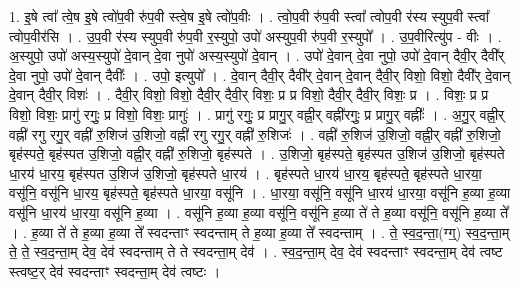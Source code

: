\documentclass[17pt]{extarticle}
\begin{document}
1. इ॒षे त्वा᳚ त्वे॒ष इ॒षे त्वो॑प॒वी रु॑प॒वी स्त्वे॒ष इ॒षे त्वो॑प॒वीः । . त्वो॒प॒वी रु॑प॒वी स्त्वा᳚ त्वोप॒वी र॑स्य स्युप॒वी स्त्वा᳚ त्वोप॒वीर॑सि । . उ॒प॒वी र॑स्य स्युप॒वी रु॑प॒वी र॒स्युपो॒ उपो॑ अस्युप॒वी रु॑प॒वी र॒स्युपो᳚ । . उ॒प॒वीरित्यु॑प - वीः । . अ॒स्युपो॒ उपो॑ अस्य॒स्युपो॑ दे॒वान् दे॒वा नुपो॑ अस्य॒स्युपो॑ दे॒वान् । . उपो॑ दे॒वान् दे॒वा नुपो॒ उपो॑ दे॒वान् दैवी॒र् दैवी᳚र् दे॒वा नुपो॒ उपो॑ दे॒वान् दैवीः᳚ । . उपो॒ इत्युपो᳚ । . दे॒वान् दैवी॒र् दैवी᳚र् दे॒वान् दे॒वान् दैवी॒र् विशो॒ विशो॒ दैवी᳚र् दे॒वान् दे॒वान् दैवी॒र् विशः॑ । . दैवी॒र् विशो॒ विशो॒ दैवी॒र् दैवी॒र् विशः॒ प्र प्र विशो॒ दैवी॒र् दैवी॒र् विशः॒ प्र । . विशः॒ प्र प्र विशो॒ विशः॒ प्रागु॑ रगुः॒ प्र विशो॒ विशः॒ प्रागुः॑ । . प्रागु॑ रगुः॒ प्र प्रागु॒र् वह्नी॒र् वह्नी॑रगुः॒ प्र प्रागु॒र् वह्नीः᳚ । . अ॒गु॒र् वह्नी॒र् वह्नी॑ रगु रगु॒र् वह्नी॑ रु॒शिज॑ उ॒शिजो॒ वह्नी॑ रगु रगु॒र् वह्नी॑ रु॒शिजः॑ । . वह्नी॑ रु॒शिज॑ उ॒शिजो॒ वह्नी॒र् वह्नी॑ रु॒शिजो॒ बृह॑स्पते॒ बृह॑स्पत उ॒शिजो॒ वह्नी॒र् वह्नी॑ रु॒शिजो॒ बृह॑स्पते । . उ॒शिजो॒ बृह॑स्पते॒ बृह॑स्पत उ॒शिज॑ उ॒शिजो॒ बृह॑स्पते धा॒रय॑ धा॒रय॒ बृह॑स्पत उ॒शिज॑ उ॒शिजो॒ बृह॑स्पते धा॒रय॑ । . बृह॑स्पते धा॒रय॑ धा॒रय॒ बृह॑स्पते॒ बृह॑स्पते धा॒रया॒ वसू॑नि॒ वसू॑नि धा॒रय॒ बृह॑स्पते॒ बृह॑स्पते धा॒रया॒ वसू॑नि । . धा॒रया॒ वसू॑नि॒ वसू॑नि धा॒रय॑ धा॒रया॒ वसू॑नि ह॒व्या ह॒व्या वसू॑नि धा॒रय॑ धा॒रया॒ वसू॑नि ह॒व्या । . वसू॑नि ह॒व्या ह॒व्या वसू॑नि॒ वसू॑नि ह॒व्या ते॑ ते ह॒व्या वसू॑नि॒ वसू॑नि ह॒व्या ते᳚ । . ह॒व्या ते॑ ते ह॒व्या ह॒व्या ते᳚ स्वदन्ताꣳ स्वदन्ताम् ते ह॒व्या ह॒व्या ते᳚ स्वदन्ताम् । . ते॒ स्व॒द॒न्ता॒(ग्ग्॒) स्व॒द॒न्ता॒म् ते॒ ते॒ स्व॒द॒न्ता॒म् देव॒ देव॑ स्वदन्ताम् ते ते स्वदन्ता॒म् देव॑ । . स्व॒द॒न्ता॒म् देव॒ देव॑ स्वदन्ताꣳ स्वदन्ता॒म् देव॑ त्वष्ट स्त्वष्ट॒र् देव॑ स्वदन्ताꣳ स्वदन्ता॒म् देव॑ त्वष्टः । \newline
\end{document}
